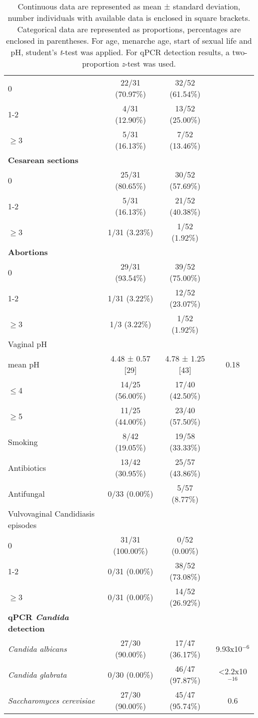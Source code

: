 \documentclass[biotech,article,submit,pdftex,moreauthors]{Definitions/mdpi}
\begin{document}
\begin{table}[H]
\begin{tabular}{@{}lccc}
        0 & 22/31 (70.97\%) & 32/52 (61.54\%) & \\
        1-2 & 4/31 (12.90\%) & 13/52 (25.00\%) & \\
        $\geq$3 & 5/31 (16.13\%) & 7/52 (13.46\%) & \\
        \midrule
        \textbf{Cesarean sections} & & & \\
        0 & 25/31 (80.65\%) & 30/52 (57.69\%) & \\
        1-2 & 5/31 (16.13\%) & 21/52 (40.38\%) & \\
        $\geq$3 & 1/31 (3.23\%) & 1/52 (1.92\%) & \\
        \midrule
        \textbf{Abortions} & & & \\
        0 & 29/31 (93.54\%) & 39/52 (75.00\%) & \\
        1-2 & 1/31 (3.22\%) & 12/52 (23.07\%) & \\
        $\geq$3 & 1/3 (3.22\%) & 1/52 (1.92\%) & \\
        \midrule
        Vaginal pH & & & \\
        mean pH & 4.48 ± 0.57 [29] & 4.78 ± 1.25 [43] & 0.18 \\
        $\leq$4 & 14/25 (56.00\%) & 17/40 (42.50\%) & \\
        $\geq$5 & 11/25 (44.00\%) & 23/40 (57.50\%) & \\
        \midrule
        Smoking & 8/42 (19.05\%) & 19/58 (33.33\%) & \\
        Antibiotics & 13/42 (30.95\%) & 25/57 (43.86\%) & \\
        Antifungal & 0/33 (0.00\%) & 5/57 (8.77\%) & \\
        \midrule
        Vulvovaginal Candidiasis episodes & & & \\
        0 & 31/31 (100.00\%) & 0/52 (0.00\%) & \\
        1-2 & 0/31 (0.00\%) & 38/52 (73.08\%) & \\
        $\geq$3 & 0/31 (0.00\%) & 14/52 (26.92\%) & \\
        \midrule
        \textbf{qPCR \textit{Candida} detection} & & & \\
        \textit{Candida albicans} & 27/30 (90.00\%) & 17/47 (36.17\%) & 9.93x10$^{-6}$ \\
        \textit{Candida glabrata} & 0/30 (0.00\%) & 46/47 (97.87\%) & <2.2x10$^{-16}$ \\
        \textit{Saccharomyces cerevisiae} & 27/30 (90.00\%) & 45/47 (95.74\%) & 0.6 \\
        \bottomrule
    \end{tabular}
    \caption*{ Continuous data are represented as mean ± standard deviation, number individuals with available data is enclosed in square brackets. Categorical data are represented as proportions, percentages are enclosed in parentheses. For age, menarche age, start of sexual life and pH, student's \textit{t}-test was applied. For qPCR detection results, a two-proportion \textit{z}-test was used. }
\end{table}
    
\end{document}
